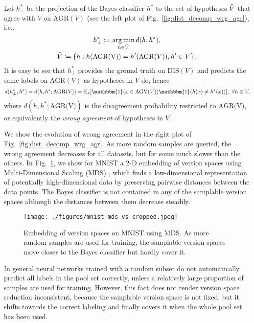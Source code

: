 \documentclass[runningheads, envcountsame, a4paper]{llncs}
\newcommand{\argmin}{\operatornamewithlimits{arg\,min}}
\newcommand{\ie}{i.e.}
\begin{document}
Let $h_\perp^*$ be the projection of the Bayes classifier $h^*$ to the set of hypotheses $\Tilde{V}$ that agree with $V$ on $\text{AGR}(V)$ (see the left plot of Fig.~\ref{fig:dist_decomp_wrg_agr}), \ie,
\begin{gather}
    h_\perp^* \coloneqq \argmin_{h \in \Tilde{V}} d(h, h^*), \\
    \Tilde{V} \coloneqq \left\{ h: h(\text{AGR(V)}) = h^\prime(\text{AGR}(V)), h^\prime \in V \right\}.
\end{gather}
It is easy to see that $h_\perp^*$  provides the ground truth on $\text{DIS}(V)$ and predicts the same labels on $\text{AGR}(V)$ as hypotheses in $V$ do, hence 
\begin{align}
    d(h_\perp^*, h^*) = d(h, h^*; \text{AGR(V)}) = \mathbb{E}_x\! \left[ \mathbbm{1}(x \in \text{AGV}(V))\mathbbm{1}(h(x) \neq h^*(x)) \right],\: \forall h \in V.
\end{align}
where $d(h, h^*; \text{AGR(V)})$ is the disagreement probability restricted to $\text{AGR(V)}$, or equivalently the \textit{wrong agreement} of hypotheses in $V$. 

We show the evolution of wrong agreement in the right plot of Fig.~\ref{fig:dist_decomp_wrg_agr}. As more random samples are queried, the wrong agreement decreases for all datasets, but for some much slower than the others. In Fig.~\ref{fig:mnist_mds_vs}, we show for MNIST a 2-D embedding of version spaces using Multi-Dimensional Scaling (MDS) \cite{Kruskal78}, which finds a low-dimensional representation of potentially high-dimensional data by preserving pairwise distances between the data points. The Bayes classifier is not contained in any of the samplable version spaces although the distances between them decrease steadily. 

\begin{figure}[t!]
\begin{center}
\texttt{[image: ./figures/mnist\_mds\_vs\_cropped.jpeg]}
\end{center}
   \caption{Embedding of version spaces on MNIST using MDS. As more random samples are used for training, the samplable version spaces move closer to the Bayes classifier but hardly cover it.}
\label{fig:mnist_mds_vs}
\end{figure}

In general neural networks trained with a random subset do not automatically predict all labels in the pool set correctly, unless a relatively large proportion of samples are used for training. However, this fact does not render version space reduction inconsistent, because the samplable version space is not fixed, but it shifts towards the correct labeling and finally covers it when the whole pool set has been used.
\end{document}
